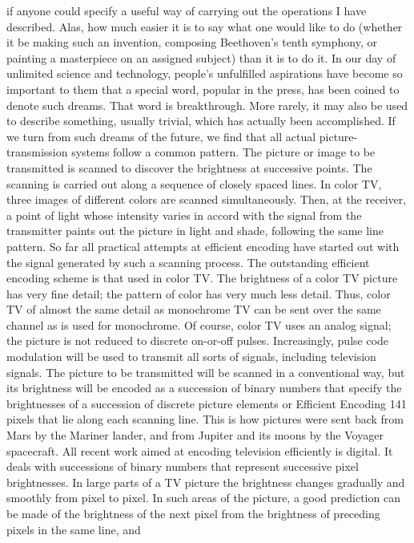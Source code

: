 {{{if anyone could specify a useful way of carrying out the
operations I have described. Alas, how much easier it is to say what
one would like to do (whether it be making such an invention,
composing Beethoven’s tenth symphony, or painting a masterpiece
on an assigned subject) than it is to do it.
In our day of unlimited science and technology, people’s unfulfilled
aspirations have become so important to them that a special
word, popular in the press, has been coined to denote such dreams.
That word is breakthrough. More rarely, it may also be used to
describe something, usually trivial, which has actually been
accomplished.
If we turn from such dreams of the future, we find that all actual
picture-transmission systems follow a common pattern. The picture
or image to be transmitted is scanned to discover the brightness at
successive points. The scanning is carried out along a sequence of
closely spaced lines. In color TV, three images of different colors
are scanned simultaneously. Then, at the receiver, a point of light
whose intensity varies in accord with the signal from the transmitter
paints out the picture in light and shade, following the same line
pattern. So far all practical attempts at efficient encoding have
started out with the signal generated by such a scanning process.
The outstanding efficient encoding scheme is that used in color
TV. The brightness of a color TV picture has very fine detail; the
pattern of color has very much less detail. Thus, color TV of almost
the same detail as monochrome TV can be sent over the same
channel as is used for monochrome. Of course, color TV uses an
analog signal; the picture is not reduced to discrete on-or-off pulses.
Increasingly, pulse code modulation will be used to transmit all
sorts of signals, including television signals. The picture to be transmitted
will be scanned in a conventional way, but its brightness
will be encoded as a succession of binary numbers that specify
the brightnesses of a succession of discrete picture elements or
Efficient Encoding 141
pixels that lie along each scanning line. This is how pictures were
sent back from Mars by the Mariner lander, and from Jupiter and
its moons by the Voyager spacecraft.
All recent work aimed at encoding television efficiently is digital.
It deals with successions of binary numbers that represent successive
pixel brightnesses.
In large parts of a TV picture the brightness changes gradually
and smoothly from pixel to pixel. In such areas of the picture, a
good prediction can be made of the brightness of the next pixel
from the brightness of preceding pixels in the same line, and
}}}
